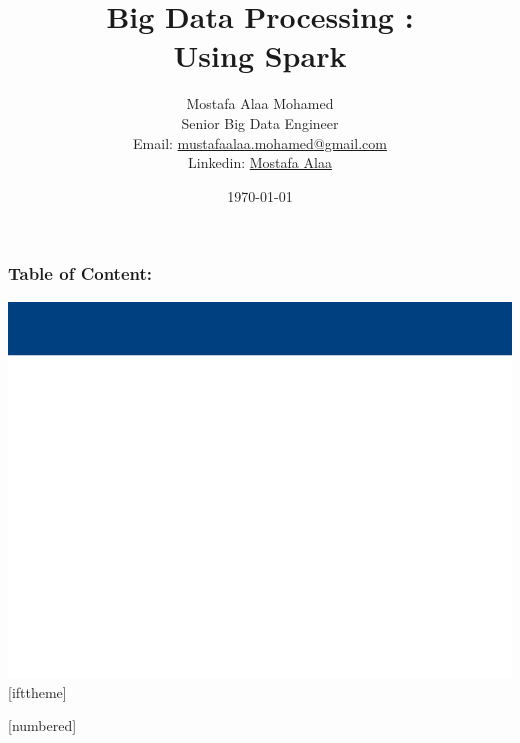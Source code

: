 \documentclass[handout]{beamer}
\title{Big Data Processing :\\ Using Spark}
\author{Mostafa Alaa Mohamed\\ Senior Big Data Engineer \\ Email: \href{mailto: mustafaalaa.mohamed@gmail.com}{mustafaalaa.mohamed@gmail.com} \\ Linkedin: \href{https://www.linkedin.com/in/mostafa-alaa-5120615b/}{Mostafa Alaa} }
\institute{
Big Data \& Analytics Department, Etisalat UAE
}
\date{\gray \today}
\begin{document}
\begin{frame}
  \titlepage
  \vspace{5cm}
\end{frame}

\begin{frame}
	  \frametitle{Table of Content:}
	\tableofcontents
\end{frame}
%



%
%
{\includegraphics[width=\paperwidth,height=\paperheight]{nabil_slide_helwan_bg}}
[ifttheme]

[numbered]


%
%

%


%
%
%

%
\end{document}
